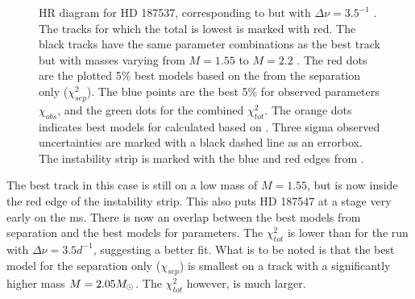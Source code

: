 \begin{figure}[htbp]
	\centering
	\caption{HR diagram for HD 187537, corresponding to  but with $\Delta \nu = 3.5^{-1}$ . The tracks for which the total \chis is lowest is marked with red. The black tracks have the same parameter combinations as the best track but with masses varying from $M=1.55$ to $M=2.2$ \msun. The red dots are the plotted 5\% best models based on the \chis from the separation only ($\chi_{sep}^2$). The blue points are the best 5\% for observed parameters $\chi_{obs}$, and the green dots for the combined $\chi_{tot}^2$. The orange dots indicates best models for \chis calculated based on \lum. Three sigma observed uncertainties are marked with a black dashed line as an errorbox. The instability strip is marked with the blue and red edges from \citet{murphy2019gaia}.}
	\label{finalsuper7}
\end{figure}


The best track in this case is still on a low mass of $M=1.55$\msun, but is now inside the red edge of the instability strip. This also puts HD 187547 at a stage very early on the ms. There is now an overlap between the best models from separation and the best models for parameters. The $\chi_{ tot}^2$ is lower than for the run with $\Delta \nu = 3.5d^{-1}$, suggesting a better fit. What is to be noted is that the best model for the separation only ($\chi_{sep}$) is smallest on a track with a significantly higher mass $M=2.05M_{\odot}$.  The $\chi_{tot}^2$ however, is much larger. 

